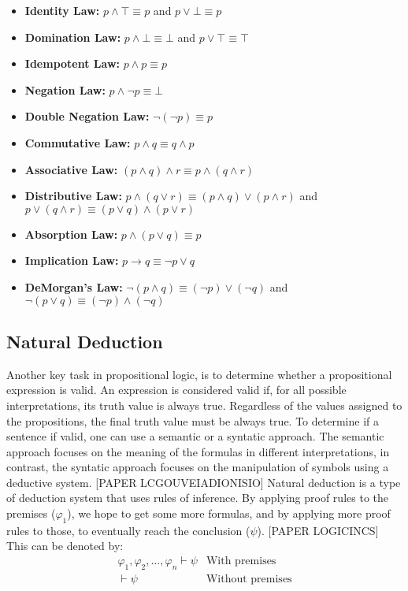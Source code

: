 \begin{itemize}
    \begin{itemize}
        \item \textbf{Identity Law:} \( p \land \top \equiv p \) and \( p \lor \bot \equiv p \)
        \item \textbf{Domination Law:} \( p \land \bot \equiv \bot \) and \( p \lor \top \equiv \top \) 
        \item \textbf{Idempotent Law:} \( p \land p \equiv p \)
        \item \textbf{Negation Law:} \( p \land \neg p \equiv \bot \)
        \item \textbf{Double Negation Law:} \( \neg (\neg p) \equiv p \)
        \item \textbf{Commutative Law:} \( p \land q \equiv q \land p \)
        \item \textbf{Associative Law:} \( (p \land q) \land r \equiv p \land (q \land r) \)
        \item \textbf{Distributive Law:} \( p \land (q \lor r) \equiv (p \land q) \lor (p \land r) \) and \( p \lor (q \land r) \equiv (p\lor q) \land (p \lor r) \)
        \item \textbf{Absorption Law:} \( p \land (p \lor q) \equiv p \)
        \item \textbf{Implication Law:} \( p \to q \equiv \neg p \lor q \)
        \item \textbf{DeMorgan’s Law:} \( \neg (p \land q) \equiv (\neg p) \lor (\neg q) \) and \( \neg (p \lor q) \equiv (\neg p) \land (\neg q) \)
    \end{itemize}
        
\end{itemize}



\subsection{Natural Deduction} 
\label{chap:prop-decution}
Another key task in propositional logic, is to determine whether a propositional expression is valid. An expression is considered valid if, for all possible interpretations, its truth value is always true. Regardless of the values assigned to the propositions, the final truth value must be always true. To determine if a sentence if valid, one can use a semantic or a syntatic approach. The semantic approach focuses on the meaning of the formulas in different interpretations, in contrast, the syntatic approach focuses on the manipulation of symbols using a deductive system.
[PAPER LCGOUVEIADIONISIO] Natural deduction is a type of deduction system that uses rules of inference. By applying proof rules to the premises (\(\varphi_1\)), we hope to get some more formulas, and by applying more proof rules to those, to eventually reach the conclusion (\(\psi\)). [PAPER LOGICINCS] This can be denoted by:
\[
\begin{array}{lcl}
\varphi_1, \varphi_2, \dots, \varphi_n \vdash \psi & \text{With premises} \\
\vdash \psi & \text{Without premises}
\end{array}
\]

